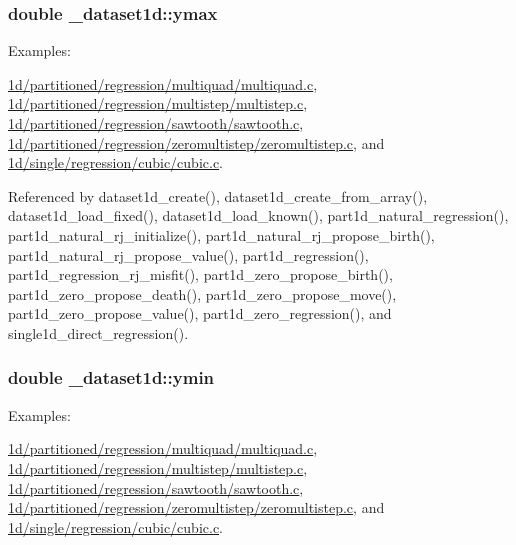 \subsubsection[{\texorpdfstring{ymax}{ymax}}]{\setlength{\rightskip}{0pt plus 5cm}double \+\_\+dataset1d\+::ymax}\hypertarget{struct__dataset1d_aa852aa13aa0a0d4e2b0a8bf83d03fc70}{}\label{struct__dataset1d_aa852aa13aa0a0d4e2b0a8bf83d03fc70}
\begin{Desc}
\item[Examples\+: ]\par
\hyperlink{1d_2partitioned_2regression_2multiquad_2multiquad_8c-example}{1d/partitioned/regression/multiquad/multiquad.\+c}, \hyperlink{1d_2partitioned_2regression_2multistep_2multistep_8c-example}{1d/partitioned/regression/multistep/multistep.\+c}, \hyperlink{1d_2partitioned_2regression_2sawtooth_2sawtooth_8c-example}{1d/partitioned/regression/sawtooth/sawtooth.\+c}, \hyperlink{1d_2partitioned_2regression_2zeromultistep_2zeromultistep_8c-example}{1d/partitioned/regression/zeromultistep/zeromultistep.\+c}, and \hyperlink{1d_2single_2regression_2cubic_2cubic_8c-example}{1d/single/regression/cubic/cubic.\+c}.\end{Desc}


Referenced by dataset1d\+\_\+create(), dataset1d\+\_\+create\+\_\+from\+\_\+array(), dataset1d\+\_\+load\+\_\+fixed(), dataset1d\+\_\+load\+\_\+known(), part1d\+\_\+natural\+\_\+regression(), part1d\+\_\+natural\+\_\+rj\+\_\+initialize(), part1d\+\_\+natural\+\_\+rj\+\_\+propose\+\_\+birth(), part1d\+\_\+natural\+\_\+rj\+\_\+propose\+\_\+value(), part1d\+\_\+regression(), part1d\+\_\+regression\+\_\+rj\+\_\+misfit(), part1d\+\_\+zero\+\_\+propose\+\_\+birth(), part1d\+\_\+zero\+\_\+propose\+\_\+death(), part1d\+\_\+zero\+\_\+propose\+\_\+move(), part1d\+\_\+zero\+\_\+propose\+\_\+value(), part1d\+\_\+zero\+\_\+regression(), and single1d\+\_\+direct\+\_\+regression().

\subsubsection[{\texorpdfstring{ymin}{ymin}}]{\setlength{\rightskip}{0pt plus 5cm}double \+\_\+dataset1d\+::ymin}\hypertarget{struct__dataset1d_afaee8c7cef9ae50d6c7387f3ac7d4379}{}\label{struct__dataset1d_afaee8c7cef9ae50d6c7387f3ac7d4379}
\begin{Desc}
\item[Examples\+: ]\par
\hyperlink{1d_2partitioned_2regression_2multiquad_2multiquad_8c-example}{1d/partitioned/regression/multiquad/multiquad.\+c}, \hyperlink{1d_2partitioned_2regression_2multistep_2multistep_8c-example}{1d/partitioned/regression/multistep/multistep.\+c}, \hyperlink{1d_2partitioned_2regression_2sawtooth_2sawtooth_8c-example}{1d/partitioned/regression/sawtooth/sawtooth.\+c}, \hyperlink{1d_2partitioned_2regression_2zeromultistep_2zeromultistep_8c-example}{1d/partitioned/regression/zeromultistep/zeromultistep.\+c}, and \hyperlink{1d_2single_2regression_2cubic_2cubic_8c-example}{1d/single/regression/cubic/cubic.\+c}.\end{Desc}


